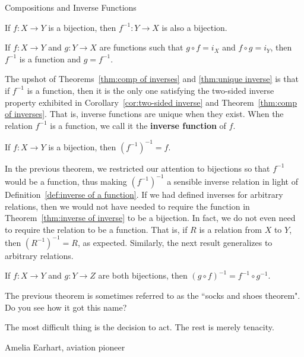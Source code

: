 \begin{section}{Compositions and Inverse Functions}
\begin{theorem}\label{thm:f inverse bijection}
If $f:X\to Y$ is a bijection, then $f^{-1}:Y\to X$ is also a bijection.
\end{theorem}

\begin{theorem}\label{thm:unique inverse}
If $f:X\to Y$ and $g:Y\to X$ are functions such that $g\circ f=i_X$ and $f\circ g=i_Y$, then $f^{-1}$ is a function and $g=f^{-1}$.
\end{theorem}

The upshot of Theorems~\ref{thm:comp of inverses} and \ref{thm:unique inverse} is that if $f^{-1}$ is a function, then it is the only one satisfying the two-sided inverse property exhibited in Corollary~\ref{cor:two-sided inverse} and Theorem~\ref{thm:comp of inverses}. That is, inverse functions are unique when they exist. When the relation $f^{-1}$ is a function, we call it the \textbf{inverse function} of $f$.

\begin{theorem}\label{thm:inverse of inverse}
If $f:X\to Y$ is a bijection, then $(f^{-1})^{-1}=f$.
\end{theorem}

In the previous theorem, we restricted our attention to bijections so that $f^{-1}$ would be a function, thus making $(f^{-1})^{-1}$ a sensible inverse relation in light of Definition~\ref{def:inverse of a function}.  If we had defined inverses for arbitrary relations, then we would not have needed to require the function in Theorem~\ref{thm:inverse of inverse} to be a bijection. In fact, we do not even need to require the relation to be a function.  That is, if $R$ is a relation from $X$ to $Y$, then $(R^{-1})^{-1}=R$, as expected. Similarly, the next result generalizes to arbitrary relations.

\begin{theorem}
If $f:X\to Y$ and $g:Y\to Z$ are both bijections, then $(g\circ f)^{-1}=f^{-1}\circ g^{-1}$.
\end{theorem}

The previous theorem is sometimes referred to as the ``socks and shoes theorem".  Do you see how it got this name?

\epigraph{The most difficult thing is the decision to act. The rest is merely tenacity.}{Amelia Earhart, aviation pioneer}

\end{section}